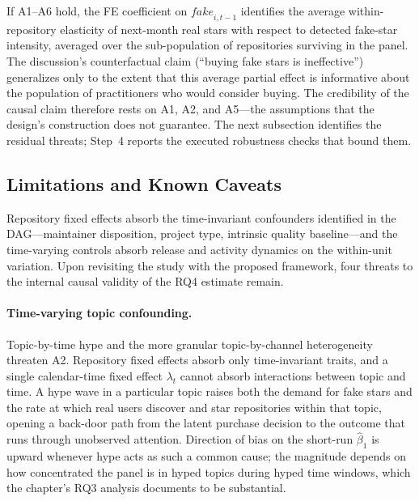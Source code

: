 If A1--A6 hold, the FE coefficient on $\textit{fake}_{i, t-1}$ identifies the average within-repository elasticity of next-month real stars with respect to detected fake-star intensity, averaged over the sub-population of repositories surviving in the panel.
The discussion's counterfactual claim (``buying fake stars is ineffective'') generalizes only to the extent that this average partial effect is informative about the population of practitioners who would consider buying.
The credibility of the causal claim therefore rests on A1, A2, and A5---the assumptions that the design's construction does not guarantee.
The next subsection identifies the residual threats; Step~4 reports the executed robustness checks that bound them.

\subsection{Limitations and Known Caveats}
\label{sec:fake-stars-credibility-limitations}

Repository fixed effects absorb the time-invariant confounders identified in the DAG---maintainer disposition, project type, intrinsic quality baseline---and the time-varying controls absorb release and activity dynamics on the within-unit variation.
Upon revisiting the study with the proposed framework, four threats to the internal causal validity of the RQ4 estimate remain.

\paragraph{Time-varying topic confounding.}
Topic-by-time hype and the more granular topic-by-channel heterogeneity threaten A2.
Repository fixed effects absorb only time-invariant traits, and a single calendar-time fixed effect $\lambda_t$ cannot absorb interactions between topic and time.
A hype wave in a particular topic raises both the demand for fake stars and the rate at which real users discover and star repositories within that topic, opening a back-door path from the latent purchase decision to the outcome that runs through unobserved attention.
Direction of bias on the short-run $\hat\beta_1$ is upward whenever hype acts as such a common cause; the magnitude depends on how concentrated the panel is in hyped topics during hyped time windows, which the chapter's RQ3 analysis documents to be substantial.

